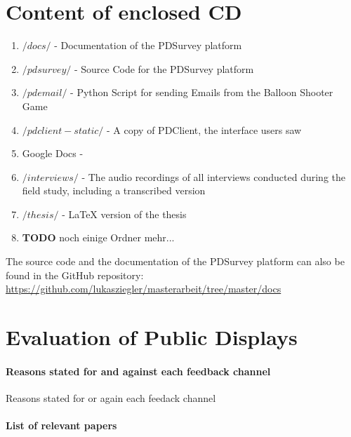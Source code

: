 \section{Content of enclosed CD}
\label{appendix:cd-contents}


    \begin{enumerate}
    \item $/docs/$ - Documentation of the PDSurvey platform
    \item $/pdsurvey/$ - Source Code for the PDSurvey platform
    \item $/pdemail/$ - Python Script for sending Emails from the Balloon Shooter Game
    \item $/pdclient-static/$ - A copy of PDClient, the interface users saw
    \item Google Docs - 
    \item $/interviews/$ - The audio recordings of all interviews conducted during the field study, including a transcribed version
    \item $/thesis/$ - LaTeX version of the thesis
    \item \textbf{TODO} noch einige Ordner mehr...
    \end{enumerate}

  The source code and the documentation of the PDSurvey platform can also be found in the GitHub repository: \url{https://github.com/lukasziegler/masterarbeit/tree/master/docs}



\cleardoublepage
\section{Evaluation of Public Displays}
\label{appendix:evaluation-of-PDs}

  \paragraph{Reasons stated for and against each feedback channel}

  \begin{table}[h]
    
    \caption{Reasons stated for or again each feedack channel}
    \label{table:feedback-channels--pro-con}
  \end{table}

\clearpage

  \paragraph{List of relevant papers} 

